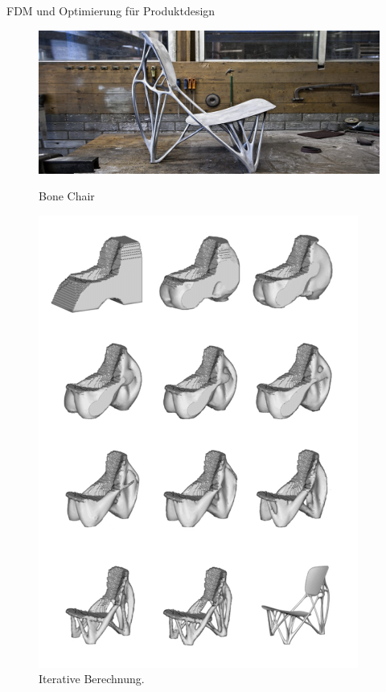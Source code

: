 \documentclass{beamer}
\begin{document}
\begin{frame}{FDM und Optimierung f\"ur Produktdesign}
   \begin{figure}[H]
       \begin{minipage}{0.6\textwidth}
           \centering
           \vfill
           \includegraphics[width=\linewidth]{figures/beispiele/stals-2.jpg}
           \caption{Bone Chair \parencite{laarman2006}}
           \label{fig:stuhl-1}
       \end{minipage}
       \hfill
       \begin{minipage}{0.3\textwidth}
           \centering
           \vfill
           \includegraphics[width=\linewidth]{figures/beispiele/stals-1.png}
           \caption{Iterative Berechnung. \parencite{stals2015}}
           \label{fig:stuhl-2}
       \end{minipage}
    \end{figure}
\end{frame}
\end{document}
